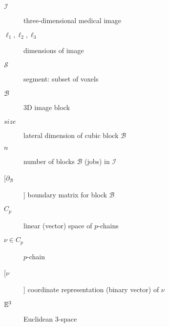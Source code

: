 \documentclass[11pt, oneside]{article}   	%
\begin{document}
\begin{description}
\item[$\mathcal{I}$]  three-dimensional medical image
\\[-8mm]
\item[$\ell_1, \ell_2, \ell_3$]  dimensions of image
\\[-8mm]
\item[$\mathcal{S}$]  segment: subset of voxels
\\[-8mm]
\item[$\mathcal{B}$] 3D image block 
\\[-8mm]
\item[$size$] lateral dimension of cubic block $\mathcal{B}$ 
\\[-8mm]
\item[$n$]	number of blocks $\mathcal{B}$ (jobs) in $\mathcal{I}$
\\[-8mm]
\item[[$\partial_\mathcal{B}$] ]  boundary matrix for block $\mathcal{B}$
\\[-8mm]
\item[$C_p$] linear (vector) space of $p$-chains
\\[-8mm]
\item[$\nu\in C_p$] $p$-chain
\\[-8mm]
\item[[$\nu$]] coordinate representation (binary vector) of  $\nu$
\\[-8mm]
\item[$\mathbb{E}^3$] Euclidean 3-space
\end{description}
\end{document}
